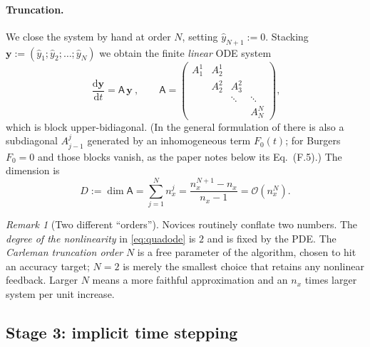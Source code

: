 \documentclass[11pt,a4paper]{article}
\theoremstyle{plain}
\theoremstyle{definition}
\theoremstyle{remark}
\newtheorem{remark}[proposition]{Remark}
\newcommand{\Oh}{\mathcal{O}}
\newcommand{\dd}{\mathrm{d}}
\newcommand{\yvec}{\bm{y}}
\newcommand{\Amat}{\mathsf{A}}
\begin{document}
\paragraph{Truncation.}  We close the system by hand at order $N$, setting
$\hat y_{N+1}:=0$.  Stacking
$\yvec := (\hat y_1;\hat y_2;\dots;\hat y_N)$ we obtain the finite
\emph{linear} ODE system \cite[Eq.~(E.2)]{Setty2026}
\begin{equation}
\boxed{\ \frac{\dd\yvec}{\dd t} = \Amat\,\yvec\ },
\qquad
\Amat=
\begin{pmatrix}
A^1_1 & A^1_2 & & \\
 & A^2_2 & A^2_3 & \\
 & & \ddots & \ddots\\
 & & & A^N_N
\end{pmatrix},
\label{eq:carlemanODE}
\end{equation}
which is block upper-bidiagonal.  (In the general formulation of
\cite[Eq.~(E.3)]{Setty2026} there is also a subdiagonal $A^j_{j-1}$ generated by
an inhomogeneous term $F_0(t)$; for Burgers $F_0=0$ and those blocks vanish, as
the paper notes below its Eq.~(F.5).)  The dimension is
\begin{equation}
D := \dim\Amat = \sum_{j=1}^{N}n_x^j
= \frac{n_x^{N+1}-n_x}{n_x-1}=\Oh\!\left(n_x^N\right).
\label{eq:Dim}
\end{equation}

\begin{remark}[Two different ``orders''] Novices routinely conflate two numbers.
The \emph{degree of the nonlinearity} in \eqref{eq:quadode} is $2$ and is fixed
by the PDE.  The \emph{Carleman truncation order} $N$ is a free parameter of the
algorithm, chosen to hit an accuracy target; $N=2$ is merely the smallest choice
that retains any nonlinear feedback.  Larger $N$ means a more faithful
approximation and an $n_x$ times larger system per unit increase.
\end{remark}

\subsection{Stage 3: implicit time stepping}
\label{sec:time}
\end{document}
